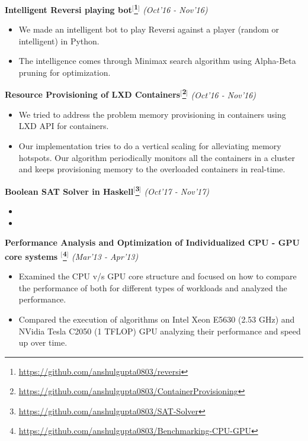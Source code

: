 \documentclass[a4paper,10pt]{article}
\begin{document}
\indent\small{\textbf{Intelligent Reversi playing bot$^[$\footnote{\href{https://github.com/anshulgupta0803/reversi}{https://github.com/anshulgupta0803/reversi}}$^]$}}	\hfill	\small{\textit{(Oct'16 - Nov'16)}}
\begin{itemize}
 \item We made an intelligent bot to play Reversi against a player (random or intelligent) in Python.
 \item The intelligence comes through Minimax search algorithm using Alpha-Beta pruning for optimization.
\end{itemize}

\indent\small{\textbf{Resource Provisioning of LXD Containers$^[$\footnote{\href{https://github.com/anshulgupta0803/ContainerProvisioning}{https://github.com/anshulgupta0803/ContainerProvisioning}}$^]$}}	\hfill	\small{\textit{(Oct'16 - Nov'16)}}
\begin{itemize}
 \item We tried to address the problem memory provisioning in containers using LXD API for containers.
 \item Our implementation tries to do a vertical scaling for alleviating memory hotspots. Our algorithm periodically monitors all the containers in a cluster and keeps provisioning memory to the overloaded containers in real-time.
\end{itemize}

\indent\small{\textbf{Boolean SAT Solver in Haskell$^[$\footnote{\href{https://github.com/anshulgupta0803/SAT-Solver}{https://github.com/anshulgupta0803/SAT-Solver}}$^]$}}	\hfill	\small{\textit{(Oct'17 - Nov'17)}}
\begin{itemize}
 \item 
 \item 
\end{itemize}

\indent\small{\textbf{Performance Analysis and Optimization of Individualized CPU - GPU core systems $^[$\footnote{\href{https://github.com/anshulgupta0803/Benchmarking-CPU-GPU}{https://github.com/anshulgupta0803/Benchmarking-CPU-GPU}}$^]$}}	\hfill	\small{\textit{(Mar'13 - Apr'13)}}
\begin{itemize}
 \item Examined the CPU v/s GPU core structure and focused on how to compare the performance of both for different types of workloads and analyzed the performance.
 \item Compared the execution of algorithms on Intel Xeon E5630 (2.53 GHz) and NVidia Tesla C2050 (1 TFLOP) GPU analyzing their performance and speed up over time.
\end{itemize}
\end{document}
